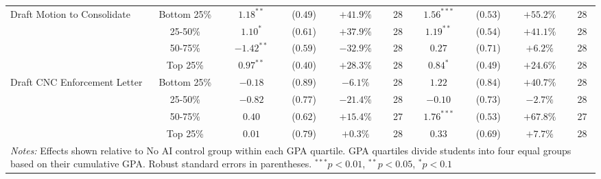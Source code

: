\begin{table}[!htbp]
\begin{tabular}{lccccccccc}
\hline
\multirow{4}{*}{Draft Motion to Consolidate} & Bottom 25\% & $1.18^{**}$ & ($0.49$) & $+41.9\%$ & 28 & $1.56^{***}$ & ($0.53$) & $+55.2\%$ & 28 \\
& 25-50\% & $1.10^{*}$ & ($0.61$) & $+37.9\%$ & 28 & $1.19^{**}$ & ($0.54$) & $+41.1\%$ & 28 \\
& 50-75\% & $-1.42^{**}$ & ($0.59$) & $-32.9\%$ & 28 & $0.27$ & ($0.71$) & $+6.2\%$ & 28 \\
& Top 25\% & $0.97^{**}$ & ($0.40$) & $+28.3\%$ & 28 & $0.84^{*}$ & ($0.49$) & $+24.6\%$ & 28 \\
\hline
\multirow{4}{*}{Draft CNC Enforcement Letter} & Bottom 25\% & $-0.18$ & ($0.89$) & $-6.1\%$ & 28 & $1.22$ & ($0.84$) & $+40.7\%$ & 28 \\
& 25-50\% & $-0.82$ & ($0.77$) & $-21.4\%$ & 28 & $-0.10$ & ($0.73$) & $-2.7\%$ & 28 \\
& 50-75\% & $0.40$ & ($0.62$) & $+15.4\%$ & 27 & $1.76^{***}$ & ($0.53$) & $+67.8\%$ & 27 \\
& Top 25\% & $0.01$ & ($0.79$) & $+0.3\%$ & 28 & $0.33$ & ($0.69$) & $+7.7\%$ & 28 \\
\hline
\multicolumn{10}{p{0.95\linewidth}}{\footnotesize \textit{Notes:} Effects shown relative to No AI control group within each GPA quartile. GPA quartiles divide students into four equal groups based on their cumulative GPA. Robust standard errors in parentheses. $^{***}p<0.01$, $^{**}p<0.05$, $^{*}p<0.1$}
\end{tabular}
\end{table}
